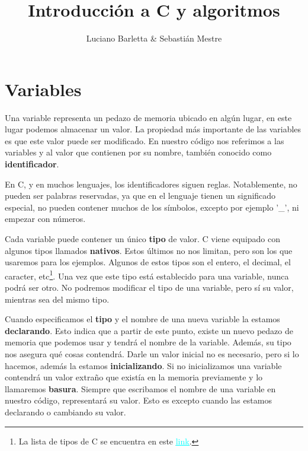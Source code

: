 \documentclass[10pt]{article}
\begin{document}
\title{Introducción a C y algoritmos}
\author{Luciano Barletta \& Sebastián Mestre}
\maketitle
\date
\newpage


\section{Variables}

Una variable representa un pedazo de memoria ubicado en algún lugar, en este lugar podemos almacenar un valor. La propiedad más importante de las variables es que este valor puede ser modificado. En nuestro código nos referimos a las variables y al valor que contienen por su nombre, también conocido como \textbf{identificador}.

\bigskip

En C, y en muchos lenguajes, los identificadores siguen reglas. Notablemente, no pueden ser palabras reservadas, ya que en el lenguaje tienen un significado especial, no pueden contener muchos de los símbolos, excepto por ejemplo '\_', ni empezar con números.

\bigskip

Cada variable puede contener un único \textbf{tipo} de valor. C viene equipado con algunos tipos llamados \textbf{nativos}. Estos últimos no nos limitan, pero son los que usaremos para los ejemplos. Algunos de estos tipos son el entero, el decimal, el caracter, etc\footnote{La lista de tipos de C se encuentra en este \href{http://www.it.uc3m.es/pbasanta/asng/course_notes/data_types_es.html}{\textcolor{cyan}{\underline{link}}}.}. Una vez que este tipo está establecido para una variable, nunca podrá ser otro. No podremos modificar el tipo de una variable, pero sí su valor, mientras sea del mismo tipo.

\bigskip

Cuando especificamos el \textbf{tipo} y el nombre de una nueva variable la estamos \textbf{declarando}. Esto indica que a partir de este punto, existe un nuevo pedazo de memoria que podemos usar y tendrá el nombre de la variable. Además, su tipo nos asegura qué cosas contendrá. Darle un valor inicial no es necesario, pero si lo hacemos, además la estamos \textbf{inicializando}. Si no inicializamos una variable contendrá un valor extraño que existía en la memoria previamente y lo llamaremos \textbf{basura}. Siempre que escribamos el nombre de una variable en nuestro código, representará su valor. Esto es excepto cuando las estamos declarando o cambiando su valor.
\end{document}
